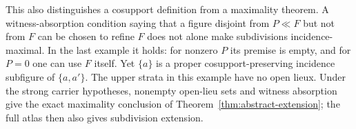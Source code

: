 This also distinguishes a cosupport definition from a maximality
theorem. A witness-absorption condition saying that a figure
disjoint from $P\ll F$ but not from $F$ can be chosen to refine
$F$ does not alone make subdivisions incidence-maximal. In the
last example it holds: for nonzero $P$ its premise is empty, and
for $P=0$ one can use $F$ itself. Yet $\{a\}$ is a proper
cosupport-preserving incidence subfigure of $\{a,a'\}$.
The upper strata in this example have no open lieux. Under the
strong carrier hypotheses, nonempty open-lieu sets and witness
absorption give the exact maximality conclusion of
Theorem~\ref{thm:abstract-extension}; the full atlas then also
gives subdivision extension.
